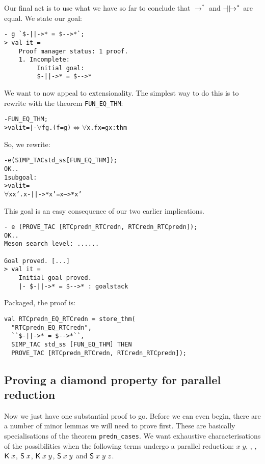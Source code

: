 Our final act is to use what we have so far to conclude that
$\rightarrow^*$ and $\mathbin{-\!\!\!\mid\mid\!\rightarrow}^*$ are equal.  We state our goal:
\begin{session}
\begin{verbatim}
- g `$-||->* = $-->*`;
> val it =
    Proof manager status: 1 proof.
    1. Incomplete:
         Initial goal:
         $-||->* = $-->*
\end{verbatim}
\end{session}
We want to now appeal to extensionality.  The simplest way to do this
is to rewrite with the theorem \texttt{FUN\_EQ\_THM}:
\begin{session}
\begin{alltt}
- FUN_EQ_THM;
> val it = |- \(\forall\)f g. (f = g) \(\Leftrightarrow\) \(\forall\)x. f x = g x : thm
\end{alltt}
\end{session}
So, we rewrite:
\begin{session}
\begin{alltt}
- e (SIMP_TAC std_ss [FUN_EQ_THM]);
OK..
1 subgoal:
> val it =
    \(\forall\)x x'. x -||->* x' = x -->* x'
\end{alltt}
\end{session}

This goal is an easy consequence of our two earlier implications.
\begin{session}
\begin{verbatim}
- e (PROVE_TAC [RTCpredn_RTCredn, RTCredn_RTCpredn]);
OK..
Meson search level: ......

Goal proved. [...]
> val it =
    Initial goal proved.
    |- $-||->* = $-->* : goalstack
\end{verbatim}
\end{session}
Packaged, the proof is:
\begin{session}
\begin{verbatim}
val RTCpredn_EQ_RTCredn = store_thm(
  "RTCpredn_EQ_RTCredn",
  ``$-||->* = $-->*``,
  SIMP_TAC std_ss [FUN_EQ_THM] THEN
  PROVE_TAC [RTCpredn_RTCredn, RTCredn_RTCpredn]);
\end{verbatim}
\end{session}


\subsection{Proving a diamond property for parallel reduction}
\label{sec:predn-diamond}

Now we just have one substantial proof to go.  Before we can even
begin, there are a number of minor lemmas we will need to prove first.
These are basically specialisations of the theorem
\texttt{predn\_cases}.  We want exhaustive characterisations of the
possibilities when the following terms undergo a parallel reduction:
$x\;y$, \KC, \SC, ${\sf K}\;x$, ${\sf S}\;x$, ${\sf K}\;x\;y$, ${\sf S}\;x\;y$ and
${\sf S}\;x\;y\;z$.

